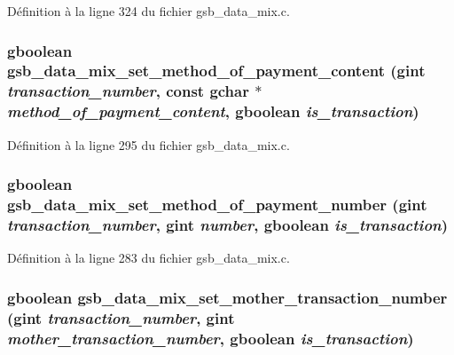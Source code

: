 Définition à la ligne 324 du fichier gsb\_\-data\_\-mix.c.

\subsubsection[{gsb\_\-data\_\-mix\_\-set\_\-method\_\-of\_\-payment\_\-content}]{\setlength{\rightskip}{0pt plus 5cm}gboolean gsb\_\-data\_\-mix\_\-set\_\-method\_\-of\_\-payment\_\-content (gint {\em transaction\_\-number}, \/  const gchar $\ast$ {\em method\_\-of\_\-payment\_\-content}, \/  gboolean {\em is\_\-transaction})}\label{gsb__data__mix_8c_ad35a8d6c8628a64b60cbda3cef75dac7}


Définition à la ligne 295 du fichier gsb\_\-data\_\-mix.c.

\subsubsection[{gsb\_\-data\_\-mix\_\-set\_\-method\_\-of\_\-payment\_\-number}]{\setlength{\rightskip}{0pt plus 5cm}gboolean gsb\_\-data\_\-mix\_\-set\_\-method\_\-of\_\-payment\_\-number (gint {\em transaction\_\-number}, \/  gint {\em number}, \/  gboolean {\em is\_\-transaction})}\label{gsb__data__mix_8c_ad3a49dff6f817169bdec431db0f39ddd}


Définition à la ligne 283 du fichier gsb\_\-data\_\-mix.c.

\subsubsection[{gsb\_\-data\_\-mix\_\-set\_\-mother\_\-transaction\_\-number}]{\setlength{\rightskip}{0pt plus 5cm}gboolean gsb\_\-data\_\-mix\_\-set\_\-mother\_\-transaction\_\-number (gint {\em transaction\_\-number}, \/  gint {\em mother\_\-transaction\_\-number}, \/  gboolean {\em is\_\-transaction})}\label{gsb__data__mix_8c_a6f6fc50274dce4f39dd79160eb87dbce}


